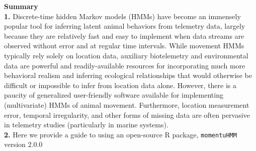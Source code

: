 \documentclass[12pt]{article}\usepackage[]{graphicx}\usepackage[]{xcolor}
\begin{document}
\noindent \textbf{Summary}\\
\textbf{1.} Discrete-time hidden Markov models (HMMs) have become an immensely popular tool for inferring latent animal behaviors from telemetry data, largely because they are relatively fast and easy to implement when data streams are observed without error and at regular time intervals. While movement HMMs typically rely solely on location data, auxiliary biotelemetry and environmental data are powerful and readily-available resources for incorporating much more behavioral realism and inferring ecological relationships that would otherwise be difficult or impossible to infer from location data alone.  However, there is a paucity of generalized user-friendly software available for implementing (multivariate) HMMs of animal movement. Furthermore, location measurement error, temporal irregularity, and other forms of missing data are often pervasive in telemetry studies (particularly in marine systems).\\ %
\textbf{2.} Here we provide a guide to using an open-source R package, \verb|momentuHMM| version 2.0.0%
\end{document}
